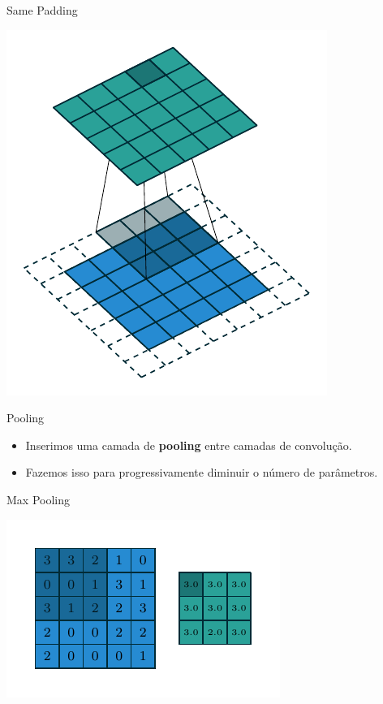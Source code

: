 \documentclass[10pt]{beamer}
\begin{document}
\begin{frame}{Same Padding}
\begin{center}
\includegraphics[scale=1]{images/same_padding_no_strides_03.pdf}
\end{center}
\end{frame}


\begin{frame}{Pooling}
\begin{itemize}
\item  Inserimos uma camada de \textbf{pooling} entre camadas de convolução.
\vspace{0.3cm}
\item  Fazemos isso para progressivamente diminuir o número de parâmetros.
\end{itemize}
\end{frame}

\begin{frame}{Max Pooling}
\begin{center}
\includegraphics[scale=1.5]{images/numerical_max_pooling_00.pdf}
\end{center}
\end{frame}
\end{document}
